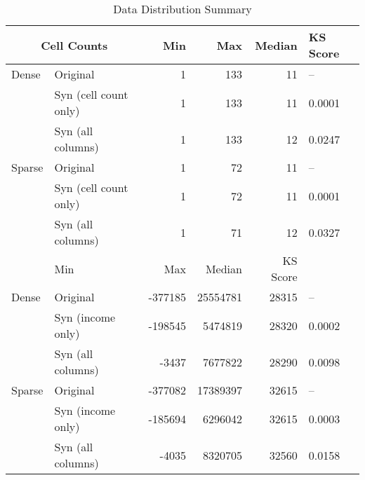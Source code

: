 \begin{table}[htbp]
\centering
\small
\caption{Data Distribution Summary}
\label{tab:region}
\begin{tabular}{llrrrl}
\toprule
\multicolumn{2}{c}{\textbf{Cell Counts}} & Min & Max & Median & KS Score \\
\midrule
Dense & Original & 1 & 133 & 11 & -- \\
 & Syn (cell count only) & 1 & 133 & 11 & 0.0001 \\
 & Syn (all columns) & 1 & 133 & 12 & 0.0247 \\
\addlinespace
Sparse & Original & 1 & 72 & 11 & -- \\
 & Syn (cell count only) & 1 & 72 & 11 & 0.0001 \\
 & Syn (all columns) & 1 & 71 & 12 & 0.0327 \\
\addlinespace
\midrule
\multicolumn{2}{c}{\textbf{Income}} & Min & Max & Median & KS Score \\
\midrule
Dense & Original & -377185 & 25554781 & 28315 & -- \\
 & Syn (income only) & -198545 & 5474819 & 28320 & 0.0002 \\
 & Syn (all columns) & -3437 & 7677822 & 28290 & 0.0098 \\
\addlinespace
Sparse & Original & -377082 & 17389397 & 32615 & -- \\
 & Syn (income only) & -185694 & 6296042 & 32615 & 0.0003 \\
 & Syn (all columns) & -4035 & 8320705 & 32560 & 0.0158 \\
\bottomrule
\end{tabular}
\end{table}
